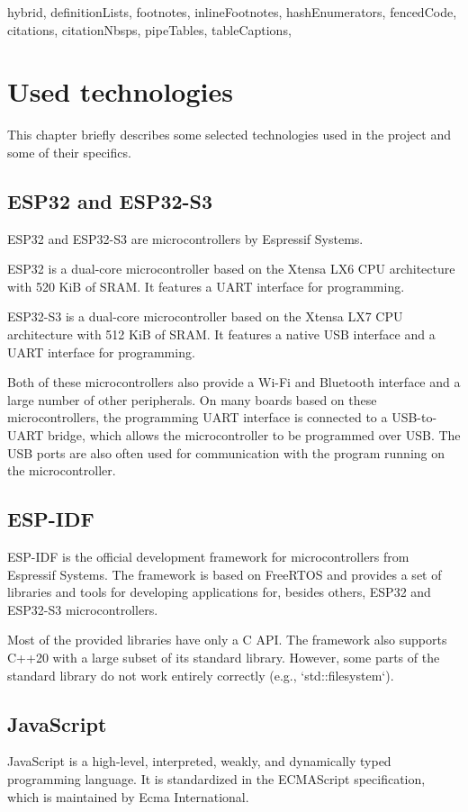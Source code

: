\begin{markdown*}{%
  hybrid,
  definitionLists,
  footnotes,
  inlineFootnotes,
  hashEnumerators,
  fencedCode,
  citations,
  citationNbsps,
  pipeTables,
  tableCaptions,
}
\chapter{Used technologies}

This chapter briefly describes some selected technologies used in the project and some of their specifics.

\section{ESP32 and ESP32-S3}

ESP32 and ESP32-S3 are microcontrollers by Espressif Systems.

ESP32 is a dual-core microcontroller based on the Xtensa LX6 CPU architecture with 520 KiB of SRAM. It features a UART interface for programming.

ESP32-S3 is a dual-core microcontroller based on the Xtensa LX7 CPU architecture with 512 KiB of SRAM. It features a native USB interface and a UART interface for programming.

Both of these microcontrollers also provide a Wi-Fi and Bluetooth interface and a large number of other peripherals. On many boards based on these microcontrollers, the programming UART interface is connected to a USB-to-UART bridge, which allows the microcontroller to be programmed over USB. The USB ports are also often used for communication with the program running on the microcontroller.

\section{ESP-IDF}

ESP-IDF is the official development framework for microcontrollers from Espressif Systems. The framework is based on FreeRTOS and provides a set of libraries and tools for developing applications for, besides others, ESP32 and ESP32-S3 microcontrollers.

Most of the provided libraries have only a C API. The framework also supports C++20 with a large subset of its standard library. However, some parts of the standard library do not work entirely correctly (e.g., `std::filesystem`).

\section{JavaScript}

JavaScript is a high-level, interpreted, weakly, and dynamically typed programming language. It is standardized in the ECMAScript specification, which is maintained by Ecma International.


\end{markdown*}
